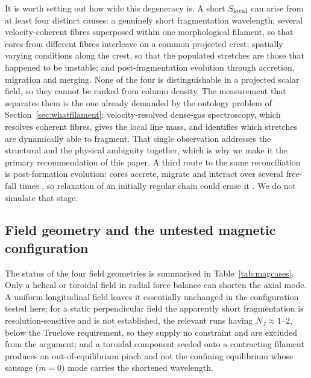 \documentclass[usenatbib,twoside,twocolumn]{mnras}
\begin{document}
It is worth setting out how wide this degeneracy is. A short $S_{\rm local}$ can arise from at least four distinct causes: a genuinely short fragmentation wavelength; several velocity-coherent fibres superposed within one morphological filament, so that cores from different fibres interleave on a common projected crest; spatially varying conditions along the crest, so that the populated stretches are those that happened to be unstable; and post-fragmentation evolution through accretion, migration and merging. None of the four is distinguishable in a projected scalar field, so they cannot be ranked from column density. The measurement that separates them is the one already demanded by the ontology problem of Section~\ref{sec:whatfilament}: velocity-resolved dense-gas spectroscopy, which resolves coherent fibres, gives the local line mass, and identifies which stretches are dynamically able to fragment. That single observation addresses the structural and the physical ambiguity together, which is why we make it the primary recommendation of this paper. A third route to the same reconciliation is post-formation evolution: cores accrete, migrate and interact over several free-fall times \citep{Kirk2016,Mattern2018}, so relaxation of an initially regular chain could erase it \citep{Clarke2020}. We do not simulate that stage.

\subsection{Field geometry and the untested magnetic configuration}
\label{sec:whymhd}

The status of the four field geometries is summarised in Table~\ref{tab:magcases}. Only a helical or toroidal field in radial force balance can shorten the axial mode. A uniform longitudinal field leaves it essentially unchanged in the configuration tested here; for a static perpendicular field the apparently short fragmentation is resolution-sensitive and is not established, the relevant runs having $N_J\approx1$--$2$, below the Truelove requirement, so they supply no constraint and are excluded from the argument; and a toroidal component seeded onto a contracting filament produces an out-of-equilibrium pinch  and not the confining equilibrium whose sausage ($m=0$) mode carries the shortened wavelength.
\end{document}
